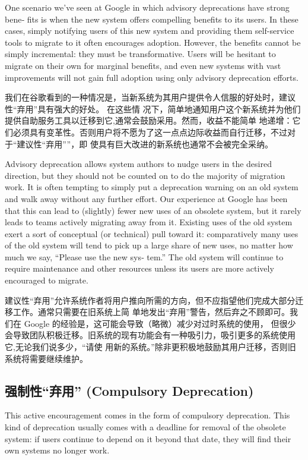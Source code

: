 \documentclass[10pt,a4paper,UTF8]{ctexart}
\begin{document}
One scenario we’ve seen at Google in which advisory deprecations have strong bene‐ fits is when the
new system offers compelling benefits to its users. In these cases, simply notifying users of this
new system and providing them self-service tools to migrate to it often encourages adoption.
However, the benefits cannot be simply incremental: they must be transformative. Users will be
hesitant to migrate on their own for marginal benefits, and even new systems with vast improvements
will not gain full adoption using only advisory deprecation efforts.

我们在谷歌看到的一种情况是，当新系统为其用户提供令人信服的好处时，建议性“弃用”具有强大的好处。 在这些情
况下，简单地通知用户这个新系统并为他们提供自助服务工具以迁移到它,通常会鼓励采用。然而，收益不能简单
地递增：它们必须具有变革性。否则用户将不愿为了这一点点边际收益而自行迁移，不过对于“建议性“弃用””，即
使具有巨大改进的新系统也通常不会被完全采纳。

Advisory deprecation allows system authors to nudge users in the desired direction, but they should
not be counted on to do the majority of migration work. It is often tempting to simply put a
deprecation warning on an old system and walk away without any further effort. Our experience at
Google has been that this can lead to (slightly) fewer new uses of an obsolete system, but it rarely
leads to teams actively migrating away from it. Existing uses of the old system exert a sort of
conceptual (or technical) pull toward it: comparatively many uses of the old system will tend to
pick up a large share of new uses, no matter how much we say, “Please use the new sys‐ tem.” The old
system will continue to require maintenance and other resources unless its users are more actively
encouraged to migrate.

建议性“弃用”允许系统作者将用户推向所需的方向，但不应指望他们完成大部分迁移工作。通常只需要在旧系统上简
单地发出“弃用”警告，然后弃之不顾即可。我们在 Google 的经验是，这可能会导致（略微）减少对过时系统的使用，
但很少会导致团队积极迁移。旧系统的现有功能会有一种吸引力，吸引更多的系统使用它,无论我们说多少，​​“请使
用新的系统。”除非更积极地鼓励其用户迁移，否则旧系统将需要继续维护。

\subsection{强制性“弃用” (Compulsory Deprecation)}
\label{sec:org9a8518c}
This active encouragement comes in the form of compulsory deprecation. This kind of deprecation
usually comes with a deadline for removal of the obsolete system: if users continue to depend on it
beyond that date, they will find their own systems no longer work.
\end{document}
